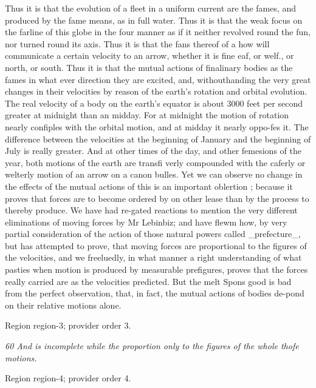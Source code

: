 \documentclass[11pt]{article}
\begin{document}
Thus it is that the evolution of a fleet in a uniform current are the fames, and produced by the fame means, as in full water. Thus it is that the weak focus on the farline of this globe in the four manner as if it neither revolved round the fun, nor turned round its axis. Thus it is that the fans thereof of a how will communicate a certain velocity to an arrow, whether it is fine eaf, or welf., or north, or south. Thus it is that the mutual actions of finalinary bodies as the fames in what ever direction they are excited, and, withouthanding the very great changes in their velocities by reason of the earth’s rotation and orbital evolution. The real velocity of a body on the earth’s equator is about 3000 feet per second greater at midnight than an midday. For at midnight the motion of rotation nearly confiples with the orbital motion, and at midday it nearly oppo-fes it. The difference between the velocities at the beginning of January and the beginning of July is really greater. And at other times of the day, and other femesions of the year, both motions of the earth are transfi verly compounded with the caferly or welterly motion of an arrow on a canon bulles. Yet we can observe no change in the effects of the mutual actions of this is an important oblertion ; because it proves that forces are to become ordered by on other lease than by the process to thereby produce. We have had re-gated reactions to mention the very different eliminations of moving forces by Mr Lebinbiz; and have flewm how, by very partial consideration of the action of those natural powers called \_prefecture\_, but has attempted to prove, that moving forces are proportional to the figures of the velocities, and we freeluedly, in what manner a right understanding of what pasties when motion is produced by measurable prefigures, proves that the forces really carried are as the velocities predicted. But the melt Spons good is bad from the perfect observation, that, in fact, the mutual actions of bodies de-pond on their relative motions alone.
\par

{\scriptsize\color{gray} Region region-3; provider order 3.\par}
\medskip

{\small\itshape 60 And is incomplete while the proportion only to the figures of the whole thofe motions.\par}

{\scriptsize\color{gray} Region region-4; provider order 4.\par}
\medskip
\end{document}
